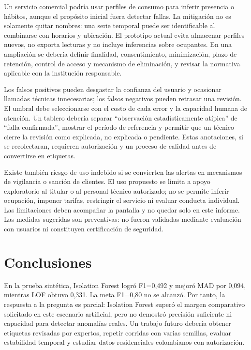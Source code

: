 \documentclass[10pt,twocolumn]{article}
\begin{document}
Un servicio comercial podría usar perfiles de consumo para inferir presencia o hábitos, aunque el propósito inicial fuera detectar fallas. La mitigación no es solamente quitar nombres: una serie temporal puede ser identificable al combinarse con horarios y ubicación. El prototipo actual evita almacenar perfiles nuevos, no exporta lecturas y no incluye inferencias sobre ocupantes. En una ampliación se debería definir finalidad, consentimiento, minimización, plazo de retención, control de acceso y mecanismo de eliminación, y revisar la normativa aplicable con la institución responsable.

Los falsos positivos pueden desgastar la confianza del usuario y ocasionar llamadas técnicas innecesarias; los falsos negativos pueden retrasar una revisión. El umbral debe seleccionarse con el costo de cada error y la capacidad humana de atención. Un tablero debería separar “observación estadísticamente atípica” de “falla confirmada”, mostrar el período de referencia y permitir que un técnico cierre la revisión como explicada, no explicada o pendiente. Estas anotaciones, si se recolectaran, requieren autorización y un proceso de calidad antes de convertirse en etiquetas.

Existe también riesgo de uso indebido si se convierten las alertas en mecanismos de vigilancia o sanción de clientes. El uso propuesto se limita a apoyo exploratorio al titular o al personal técnico autorizado; no se permite inferir ocupación, imponer tarifas, restringir el servicio ni evaluar conducta individual. Las limitaciones deben acompañar la pantalla y no quedar solo en este informe. Las medidas sugeridas son preventivas: no fueron validadas mediante evaluación con usuarios ni constituyen certificación de seguridad.

\section{Conclusiones}
En la prueba sintética, Isolation Forest logró F1=0,492 y mejoró MAD por 0,094, mientras LOF obtuvo 0,331. La meta F1=0,80 no se alcanzó. Por tanto, la respuesta a la pregunta es parcial: Isolation Forest superó el margen comparativo solicitado en este escenario artificial, pero no demostró precisión suficiente ni capacidad para detectar anomalías reales. Un trabajo futuro debería obtener etiquetas revisadas por expertos, repetir corridas con varias semillas, evaluar estabilidad temporal y estudiar datos residenciales colombianos con autorización.
\end{document}
